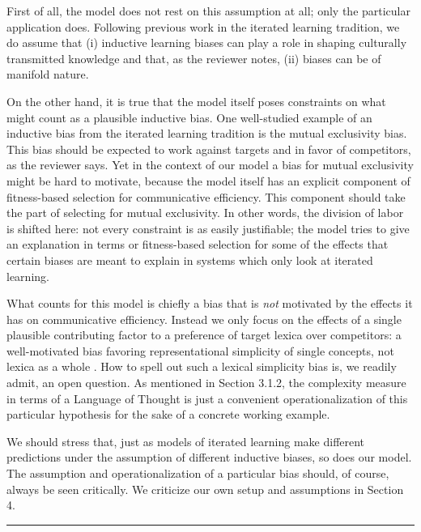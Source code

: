 \documentclass[12pt,a4paper]{article}
\begin{document}
First of all, the model does not rest on this assumption at all; only the particular application does. Following previous work in the iterated learning tradition, we do assume that (i) inductive learning biases can play a role in shaping culturally transmitted knowledge and that, as the reviewer notes, (ii) biases can be of manifold nature.  

On the other hand, it is true that the model itself poses constraints on what might count as a plausible inductive bias. One well-studied example of an inductive bias from the iterated learning tradition is the mutual exclusivity bias. This bias should be expected to work against targets and in favor of competitors, as the reviewer says. Yet in the context of our model a bias for mutual exclusivity might be hard to motivate, because the model itself has an explicit component of fitness-based selection for communicative efficiency. This component should take the part of selecting for mutual exclusivity. In other words, the division of labor is shifted here: not every constraint is as easily justifiable; the model tries to give an explanation in terms or fitness-based selection for some of the effects that certain biases are meant to explain in systems which only look at iterated learning.

What counts for this model is chiefly a bias that is \emph{not} motivated by the effects it has on communicative efficiency. Instead we only focus on the effects of a single plausible contributing factor to a preference of target lexica over competitors: a well-motivated bias favoring representational simplicity of single concepts, not lexica as a whole \citep{feldman:2000,chater+vitanyi:2003, piantadosi+etal:2012a,kirby+etal:2015,piantadosi+etal:underreview}. How to spell out such a lexical simplicity bias is, we readily admit, an open question. As mentioned in Section 3.1.2, the complexity measure in terms of a Language of Thought is just a convenient operationalization of this particular hypothesis for the sake of a concrete working example. 

We should stress that, just as models of iterated learning make different predictions under the assumption of different inductive biases, so does our model. The assumption and operationalization of a particular bias should, of course, always be seen critically. We criticize our own setup and assumptions in Section 4. 


\vspace{0.5cm}
\noindent\rule{\textwidth}{1pt}
\end{document}

